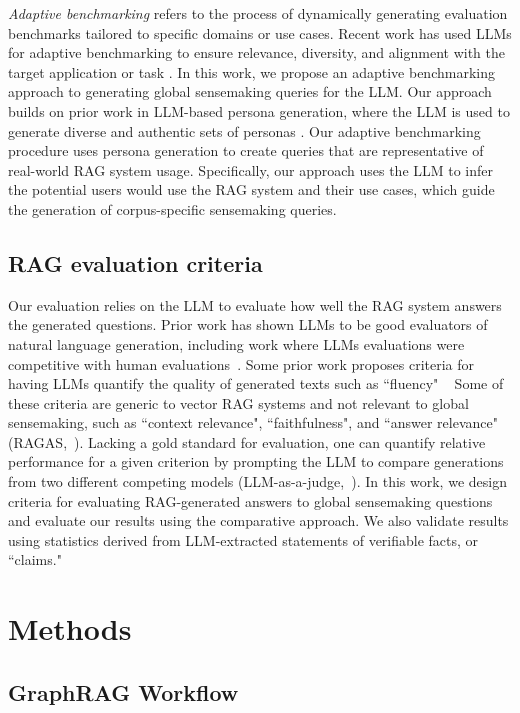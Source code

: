 \documentclass{article}
\begin{document}
\emph{Adaptive benchmarking} refers to the process of dynamically generating evaluation benchmarks tailored to specific domains or use cases.
Recent work has used LLMs for adaptive benchmarking to ensure relevance, diversity, and alignment with the target application or task \citep{yuan2024s, zhang2024darg}.
In this work, we propose an adaptive benchmarking approach to generating global sensemaking queries for the LLM.
Our approach builds on prior work in LLM-based persona generation, where the LLM is used to generate diverse and authentic sets of personas \citep{salminen2024deus, shin2024understanding, kosinski2024evaluating}.
Our adaptive benchmarking procedure uses persona generation to create queries that are representative of real-world RAG system usage.
Specifically, our approach uses the LLM to infer the potential users would use the RAG system and their use cases, which guide the generation of corpus-specific sensemaking queries.

\subsection{RAG evaluation criteria}
Our evaluation relies on the LLM to evaluate how well the RAG system answers the generated questions.
Prior work has shown LLMs to be good evaluators of natural language generation, including work where LLMs evaluations were competitive with human evaluations~\citep{wang2023chatgpt,zheng2024judging}.
Some prior work proposes criteria for having LLMs quantify the quality of generated texts such as ``fluency" ~\citep{wang2023chatgpt}
Some of these criteria are generic to vector RAG systems and not relevant to global sensemaking, such as ``context relevance", ``faithfulness", and ``answer relevance" (RAGAS,~\citealt{es2023ragas}).
Lacking a gold standard for evaluation, one can quantify relative performance for a given criterion by prompting the LLM to compare generations from two different competing models (LLM-as-a-judge,~\citep{zheng2024judging}).
In this work, we design criteria for evaluating RAG-generated answers to global sensemaking questions and evaluate our results using the comparative approach.
We also validate results using statistics derived from LLM-extracted statements of verifiable facts, or ``claims."

\section{Methods}
\subsection{GraphRAG Workflow}
\end{document}
